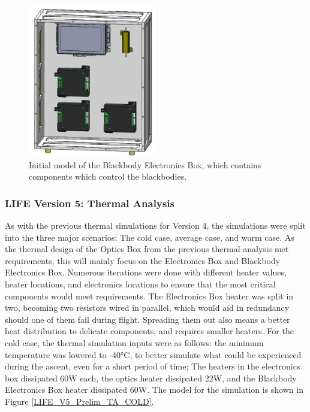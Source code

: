 \begin{figure}
    \centering
    \includegraphics[width=0.5\textwidth]{chap3_images/LIFE_V5_initial_images/BBEBox_V1_init.JPG}
    \caption{Initial model of the Blackbody Electronics Box, which contains components which control the blackbodies.}
    \label{fig:BBEBOX_PRELIM}
\end{figure}

\subsubsection{LIFE Version 5: Thermal Analysis}
As with the previous thermal simulations for Version 4, the simulations were split into the three major scenarios: The cold case, average case, and warm case. As the thermal design of the Optics Box from the previous thermal analysis met requirements, this will mainly focus on the Electronics Box and Blackbody Electronics Box. Numerous iterations were done with different heater values, heater locations, and electronics locations to ensure that the most critical components would meet requirements. The Electronics Box heater was split in two, becoming two resistors wired in parallel, which would aid in redundancy should one of them fail during flight. Spreading them out also means a better heat distribution to delicate components, and requires smaller heaters. For the cold case, the thermal simulation inputs were as follows: the minimum temperature was lowered to -40°C, to better simulate what could be experienced during the ascent, even for a short period of time; The heaters in the electronics box dissipated 60W each, the optics heater dissipated 22W, and the Blackbody Electronics Box heater dissipated 60W. The model for the simulation is shown in Figure \ref{LIFE_V5_Prelim_TA_COLD}.

